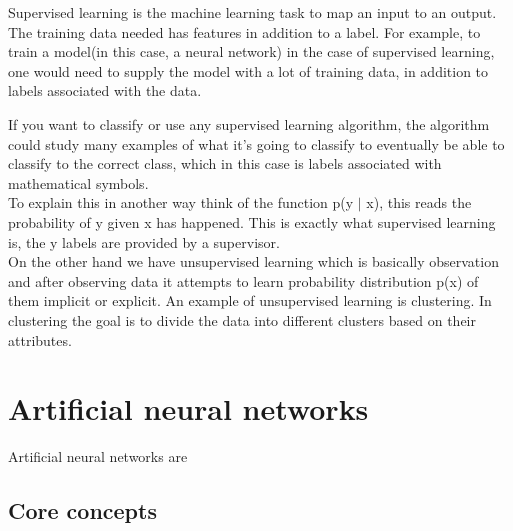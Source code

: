 Supervised learning is the machine learning task to map an input to an output. The training data needed has features in addition to a label. For example, to train a model(in this case, a neural network) in the case of supervised learning, one would need to supply the model with a lot of training data, in addition to labels associated with the data. %

If you want to classify or use any supervised learning algorithm, the algorithm could study many examples of what it's going to classify to eventually be able to classify to the correct class, which in this case is labels associated with mathematical symbols.\\ To explain this in another way think of the function p(y $|$ x), this reads the probability of y given x has happened. This is exactly what supervised learning is, the y labels are provided by a supervisor.\\

On the other hand we have unsupervised learning which is basically observation and after observing data it attempts to learn probability distribution p(x) of them implicit or explicit. An example of unsupervised learning is clustering. In clustering the goal is to divide the data into different clusters based on their attributes. \parencite{goodfellow_deep_2016}

\section{Artificial neural networks}

Artificial neural networks are 
% 
% 

\subsection{Core concepts}

